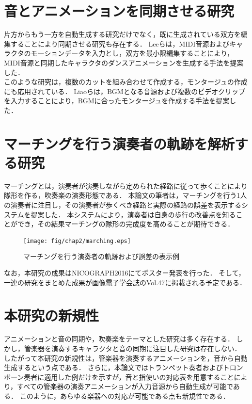 \section{音とアニメーションを同期させる研究} \label{sec:synchronization}
片方からもう一方を自動生成する研究だけでなく，既に生成されている双方を編集することにより同期させる研究も存在する．
Leeら\cite{Lee}は，MIDI音源およびキャラクタのモーションデータを入力とし，双方を最小限編集することにより，MIDI音源と同期したキャラクタのダンスアニメーションを生成する手法を提案した．\\
\indent
このような研究は，複数のカットを組み合わせて作成する，モンタージュの作成にも応用されている．
Liaoら\cite{Liao}は，BGMとなる音源および複数のビデオクリップを入力することにより，BGMに合ったモンタージュを作成する手法を提案した．

\section{マーチングを行う演奏者の軌跡を解析する研究} \label{sec:marching}
マーチングとは，演奏者が演奏しながら定められた経路に従って歩くことにより隊形を作る，吹奏楽の演奏形態である．
本論文の筆者は，マーチングを行う1人の演奏者に注目し，その演奏者が歩くべき経路と実際の経路の誤差を表示するシステムを提案した．
本システムにより，演奏者は自身の歩行の改善点を知ることができ，その結果マーチングの隊形の完成度を高めることが期待できる．
\begin{figure}[h]
	\centering
	\texttt{[image: fig/chap2/marching.eps]}
	\caption{マーチングを行う演奏者の軌跡および誤差の表示例}
	\label{fig:marching}
\end{figure}
なお，本研究の成果はNICOGRAPH2016にてポスター発表\cite{NICOGRAPH}を行った．
そして，一連の研究をまとめた成果が画像電子学会誌のVol.47\cite{iieej}に掲載される予定である．

\section{本研究の新規性}\label{sec:compere}
アニメーションと音の同期や，吹奏楽をテーマとした研究は多く存在する．
しかし，管楽器を演奏するキャラクタと音の同期に注目した研究は存在しない．
したがって本研究の新規性は，管楽器を演奏するアニメーションを，音から自動生成するという点である．
さらに，本論文ではトランペット奏者およびトロンボーン奏者に適用した例だけを示すが，音と指使いの対応表を用意することにより，すべての管楽器の演奏アニメーションが入力音源から自動生成が可能である．
このように，あらゆる楽器への対応が可能である点も新規性である．